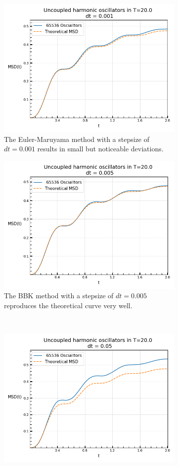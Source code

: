 	\begin{figure}[htp]
		\begin{subfigure}{0.5\textwidth}
			\centering
			\includegraphics[width=0.8\linewidth]{graphics/MSD-Euler-0.001.png}
			\caption{The Euler-Maruyama method with a stepsize of $dt=0.001$ results in small but noticeable deviations.}
		\end{subfigure}
		\begin{subfigure}{0.5\textwidth}
			\centering
			\includegraphics[width=0.8\linewidth]{graphics/MSD-BBK-0.005.png}
			\caption{The BBK method with a stepsize of $dt=0.005$ reproduces the theoretical curve very well.}
		\end{subfigure}  \\
		\begin{subfigure}{0.5\textwidth}
			\centering
			\includegraphics[width=0.8\linewidth]{graphics/MSD-Euler-0.05.png}

\end{subfigure}
\end{figure}
